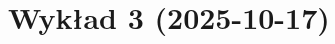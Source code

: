 \documentclass[12pt, a4paper, polish, openany]{book}
\begin{document}
\frontmatter



\tableofcontents


\mainmatter

\chapter{Wykład 3 (2025-10-17)}

\end{document}
